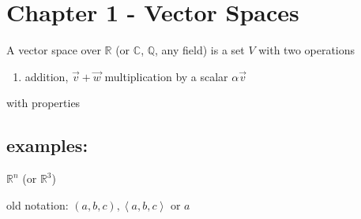 

\section*{Chapter 1 - Vector Spaces}

A vector space over $\mathbb{R}$ (or $\mathbb{C}$, $\mathbb{Q}$, any field) is a set $V$ with two operations
\begin{enumerate}
  \item addition, $\vec{v}+\vec{w}$
    multiplication by a scalar $\alpha\vec{v}$
\end{enumerate}

with properties


\subsection*{examples:}
$^{n}$ (or $^{3}$) 

old notation: $(a,b,c), \left<a,b,c\right>$
or  $a$ 

